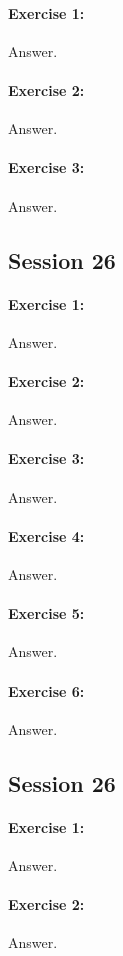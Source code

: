 \documentclass{article}
\begin{document}
\paragraph{Exercise 1:}
Answer.
\paragraph{Exercise 2:}
Answer.
\paragraph{Exercise 3:}
Answer.
\newpage

\subsection*{Session 26}
\paragraph{Exercise 1:}
Answer.
\paragraph{Exercise 2:}
Answer.
\paragraph{Exercise 3:}
Answer.
\paragraph{Exercise 4:}
Answer.
\paragraph{Exercise 5:}
Answer.
\paragraph{Exercise 6:}
Answer.
\newpage

\subsection*{Session 26}
\paragraph{Exercise 1:}
Answer.
\paragraph{Exercise 2:}
Answer.
\newpage
\end{document}
